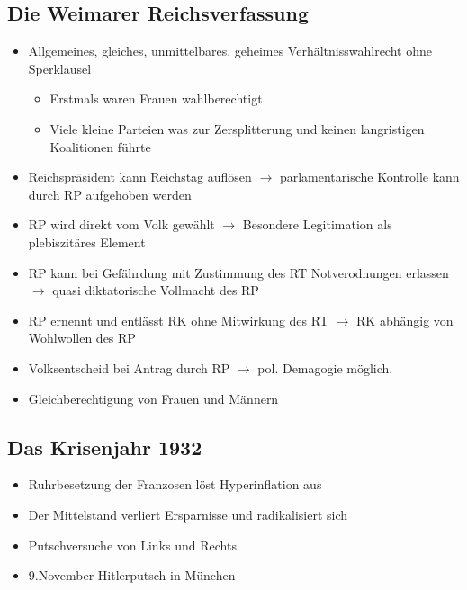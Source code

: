 \documentclass{article}
\begin{document}
\subsection*{Die Weimarer Reichsverfassung}
\begin{itemize}
    \item Allgemeines, gleiches, unmittelbares, geheimes Verhältnisswahlrecht ohne Sperklausel \begin{itemize}
              \item Erstmals waren Frauen wahlberechtigt
              \item Viele kleine Parteien was zur Zersplitterung und keinen langristigen Koalitionen führte
          \end{itemize}
    \item Reichspräsident kann Reichstag auflösen $\rightarrow$ parlamentarische Kontrolle kann durch RP aufgehoben werden
    \item RP wird direkt vom Volk gewählt $\rightarrow$ Besondere Legitimation als plebiszitäres Element
    \item RP kann bei Gefährdung mit Zustimmung des RT Notverodnungen erlassen $\rightarrow$ quasi diktatorische Vollmacht des RP
    \item RP ernennt und entlässt RK ohne Mitwirkung des RT $\rightarrow$ RK abhängig von Wohlwollen des RP
    \item Volksentscheid bei Antrag durch RP $\rightarrow$ pol. Demagogie möglich.
    \item Gleichberechtigung von Frauen und Männern
\end{itemize}
\subsection*{Das Krisenjahr 1932}
\begin{itemize}
    \item Ruhrbesetzung der Franzosen löst Hyperinflation aus
    \item Der Mittelstand verliert Ersparnisse und radikalisiert sich
    \item Putschversuche von Links und Rechts
    \item 9.November Hitlerputsch in München
\end{itemize}
\end{document}

